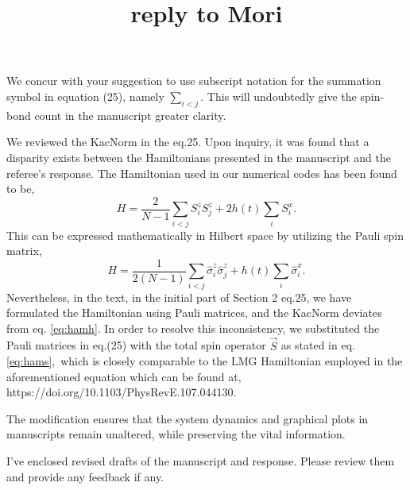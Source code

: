 \documentclass[showpacs,floatfix,superscriptaddress, onecolumn, nofootinbib, 10pt]{revtex4-2}
\title{reply to Mori}
\begin{document}
We concur with your suggestion to use subscript notation for the summation symbol in equation (25), namely $\sum_{i<j}$. This will undoubtedly give the spin-bond count in the manuscript greater clarity.

We reviewed the KacNorm in the eq.25. Upon inquiry, it was found that a disparity exists between the Hamiltonians presented in the manuscript and the referee's response. The Hamiltonian used in our numerical codes has been found to be,
\begin{equation}
    H = \frac{2}{N-1} \sum_{i<j} S^z_i S^z_j + 2h(t) \sum_i S^x_i.
    \label{eq:hams}
\end{equation}  
This can be expressed mathematically in Hilbert space by utilizing the Pauli spin matrix,
\begin{equation}
H = \frac{1}{2(N-1)} \sum_{i<j} \hat{\sigma}^z_i \hat{\sigma}^z_j + h(t) \sum_i \hat{\sigma}^x_i.
\label{eq:hamh}
\end{equation}
Nevertheless, in the text, in the initial part of Section 2 eq.25, we have formulated the Hamiltonian using Pauli matrices, and the KacNorm deviates from eq. \eqref{eq:hamh}. In order to resolve this inconsistency, we substituted the Pauli matrices in eq.(25) with the total spin operator $\vec{S}$ as stated in eq.\eqref{eq:hams}, which is closely comparable to the LMG Hamiltonian employed in the aforementioned equation which can be found at, https://doi.org/10.1103/PhysRevE.107.044130.

The modification ensures that the system dynamics and graphical plots in manuscripts remain unaltered, while preserving the vital information.


\noindent I've enclosed revised drafts of the manuscript and response. Please review them and provide any feedback if any.
\end{document}

